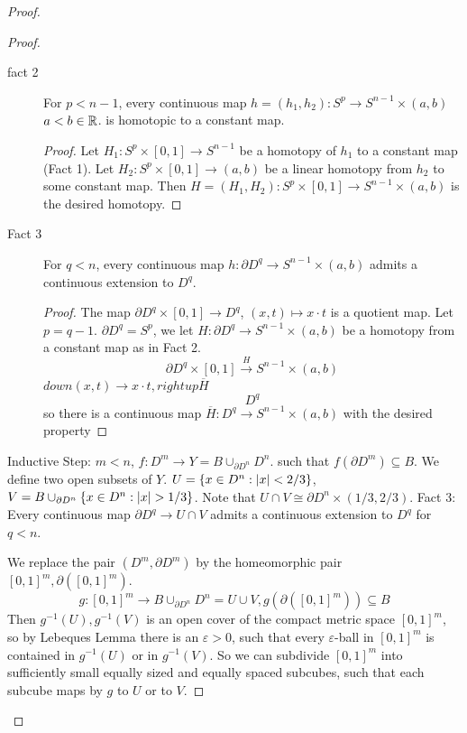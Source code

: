 \documentclass{TemplateLecture}
\begin{document}
\begin{proof}
\begin{proof}
\begin{description}
            \item[fact 2] For \(p < n-1\), every continuous map \(h = (h_1, h_2) \colon S^p \to S^{n-1} \times (a,b)\) \(a < b \in \mathbb{R}\). is homotopic to a constant map.
            \begin{proof}
                Let \(H_1\colon S^p \times [0,1] \to S^{n-1}\) be a homotopy of \(h_1\) to a constant map (Fact 1).
                Let \(H_2\colon S^p \times [0,1] \to (a,b)\) be a linear homotopy from \(h_2\) to some constant map. Then \(H = (H_1, H_2) \colon S^p \times [0,1] \to S^{n-1} \times (a,b)\) is the desired homotopy.
            \end{proof}
            \item[Fact 3] For \(q < n\), every continuous map \(h\colon \partial D^q \to S^{n-1} \times (a,b)\) admits a continuous extension to \(D^q\).
            \begin{proof}
                The map \(\partial D^q \times [0,1] \to D^q\), \((x,t) \mapsto x\cdot t\) is a quotient map. Let \(p = q-1\).
                \(\partial D^q = S^p\), we let \(H\colon \partial D^q \to S^{n-1} \times (a,b)\) be a homotopy from a constant map as in Fact 2.
                \[\partial D^q \times [0,1] \xrightarrow{H} S^{n-1} \times (a,b)\]
                \(down (x,t) \to x\cdot t, right up \overline{H}\)
                \[D^q\]
                so there is a continuous map \(\overline{H}\colon D^q \to S^{n-1} \times (a,b)\) with the desired property
            \end{proof}
        \end{description}
        Inductive Step: \(m < n\), \(f\colon D^m \to Y = B\cup_{\partial D^n} D^n\).
        such that \(f(\partial D^m) \subseteq B\). We define two open subsets of \(Y\).
        \(U = \{x \in D^n : \lvert x\rvert< 2/3 \}\), \(V = B \cup_{\partial D^n} \{x \in D^n : \lvert x\rvert > 1/3\}\). Note that \(U \cap V \cong \partial D^n \times (1/3, 2/3)\). Fact 3: Every continuous map \(\partial D^q \to U\cap V\) admits a continuous extension to \(D^q\) for \(q < n\).

        We replace the pair \((D^m, \partial D^m)\) by the homeomorphic pair \([0,1]^m, \partial([0,1]^m)\).
        \[g\colon [0,1]^m \to B\cup_{\partial D^n}D^n = U \cup V, g(\partial([0,1]^m)) \subseteq B\]
        Then \(g^{-1}(U), g^{-1}(V)\) is an open cover of the compact metric space \([0,1]^m\), so by Lebeques Lemma there is an \(\varepsilon > 0\), such that every \(\varepsilon\)-ball in \([0,1]^m\) is contained in \(g^{-1}(U)\) or in \(g^{-1}(V)\). So we can subdivide \([0,1]^m\) into sufficiently small equally sized and equally spaced subcubes, such that each subcube maps by \(g\) to \(U\) or to \(V\).


\end{proof}
\end{proof}
\end{document}
